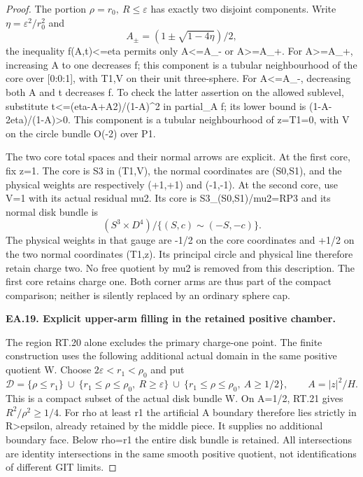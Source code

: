 \begin{proof}
The portion \(\rho=r_0,\ R\le\varepsilon\) has exactly two disjoint components.
Write \(\eta=\varepsilon^2/r_0^2\) and
\[
 A_\pm=(1\pm\sqrt{1-4\eta})/2,
\]
the inequality f(A,t)<=eta permits only A<=A\_- or A>=A\_+.
For A>=A\_+, increasing A to one decreases f; this component is a
tubular neighbourhood of the core over [0:0:1], with T1,V on their
unit three-sphere. For A<=A\_-, decreasing both A and t decreases
f. To check the latter assertion on the allowed sublevel, substitute
t<=(eta-A+A2)/(1-A)\textasciicircum{}2 in partial\_A f; its lower bound is
(1-A-2eta)/(1-A)>0. This component is a tubular neighbourhood of
z=T1=0, with V on the circle bundle O(-2) over P1.

The two core total spaces and their normal arrows are explicit.
At the first core, fix z=1. The core is S3 in (T1,V), the normal
coordinates are (S0,S1), and the physical weights are respectively
(+1,+1) and (-1,-1). At the second core, use V=1 with its actual
residual mu2. Its core is S3\_(S0,S1)/mu2=RP3 and its normal disk
bundle is
\[
 (S^3\times D^4)/\{(S,c)\sim(-S,-c)\}.             \tag{P3K.80.RT.22}
\]
The physical weights in that gauge are -1/2 on the core coordinates
and +1/2 on the two normal coordinates (T1,z). Its principal circle
and physical line therefore retain charge two. No free quotient by
mu2 is removed from this description. The first core retains charge
one. Both corner arms are thus part of the compact comparison;
neither is silently replaced by an ordinary sphere cap.



\par\medskip\noindent\textbf{EA.19. Explicit upper-arm filling in the retained positive chamber.}\par\nopagebreak[4]

The region RT.20 alone excludes the primary charge-one point.
The finite construction uses the following additional actual
domain in the same positive quotient W. Choose
\(2\varepsilon<r_1<\rho_0\) and put
\[
 \mathcal D=\{\rho\le r_1\}\ \cup\
 \{r_1\le\rho\le\rho_0,\ R\ge\varepsilon\}\ \cup\
 \{r_1\le\rho\le\rho_0,\ A\ge1/2\},
 \qquad A=|z|^2/H.
 \tag{P3K.80.EA.48}
\]
This is a compact subset of the actual disk bundle W. On A=1/2,
RT.21 gives \(R^2/\rho^2\ge1/4\). For rho at least r1 the
artificial A boundary therefore lies strictly in R>epsilon,
already retained by the middle piece. It supplies no additional
boundary face. Below rho=r1 the entire disk bundle is retained.
All intersections are identity intersections in the same smooth
positive quotient, not identifications of different GIT limits.


\end{proof}
